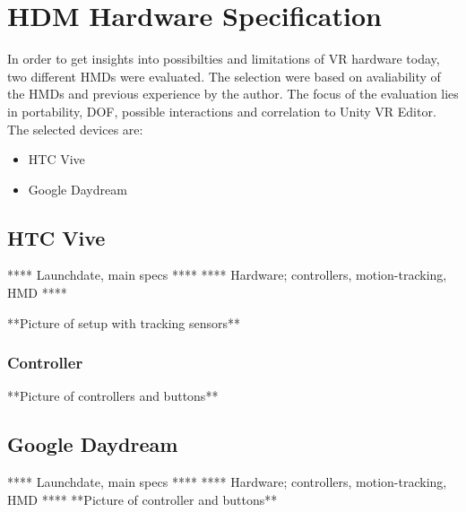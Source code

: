 \section{HDM Hardware Specification}
\label{result:hardware}
In order to get insights into possibilties and limitations of VR hardware today, two different HMDs were evaluated. The selection were based on avaliability of the HMDs and previous experience by the author. The focus of the evaluation lies in portability, DOF, possible interactions and correlation to Unity VR Editor. The selected devices are:
\begin{itemize}
  \item HTC Vive
  \item Google Daydream
\end{itemize}
\subsection{HTC Vive}
**** Launchdate, main specs ****
**** Hardware; controllers, motion-tracking, HMD ****

**Picture of setup with tracking sensors**
\subsubsection{Controller}
**Picture of controllers and buttons**
\label{result:hardware:vive:controller}
\subsection{Google Daydream}
**** Launchdate, main specs ****
**** Hardware; controllers, motion-tracking, HMD ****
\label{result:hardware:daydream:controller}
**Picture of controller and buttons**
